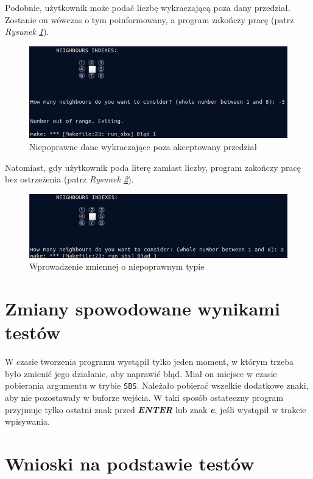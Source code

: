 \documentclass[a4paper]{article}
\begin{document}
Podobnie, u\.zytkownik mo\.ze poda\'c liczb\k{e} wykraczaj\k{a}c\k{a} poza dany przedzia\l{}.
Zostanie on w\'owczas o tym poinformowany, a program zako\'nczy prac\k{e} (patrz \textit{Rysunek \ref{fig:test5}}).
\begin{figure}[h!]
        \centering
	\includegraphics[scale=0.53]{test2}
	\caption{Niepoprawne dane wykraczaj\k{a}ce poza akceptowany przedzia\l{}}
        \label{fig:test5}
\end{figure}

Natomiast, gdy u\.zytkownik poda liter\k{e} zamiast liczby, program zako\'nczy prac\k{e} bez ostrze\.zenia (patrz \textit{Rysunek \ref{fig:test6}}).
\begin{figure}[h!]
        \centering
        \includegraphics[scale=0.58]{letter}
        \caption{Wprowadzenie zmiennej o niepoprawnym typie}
        \label{fig:test6}
\end{figure}


\section{Zmiany spowodowane wynikami test\'ow}

\quad W czasie tworzenia programu wyst\k{a}pi\l{} tylko jeden moment, w kt\'orym trzeba by\l{}o zmieni\'c jego dzia\l{}anie, aby naprawi\'c b\l{}\k{a}d.
Mia\l{} on miejsce w czasie pobierania argumentu w trybie \texttt{SBS}.
Nale\.za\l{}o pobiera\'c wszelkie dodatkowe znaki, aby nie pozostawa\l{}y w buforze wej\'scia.
W taki spos\'ob ostateczny program przyjmuje tylko ostatni znak przed \textit{\textbf{ENTER}} lub znak \textit{\textbf{e}}, 
je\'sli wyst\k{a}pi\l{} w trakcie wpisywania.

\section{Wnioski na podstawie test\'ow}
\end{document}
